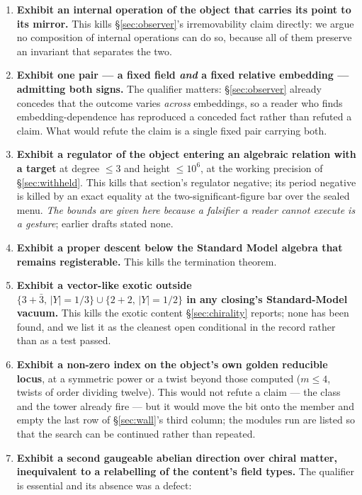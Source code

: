 \documentclass[11pt,a4paper]{article}
\theoremstyle{definition}
\theoremstyle{remark}
\begin{document}
\begin{enumerate}[leftmargin=1.6em,itemsep=3pt]
\item \textbf{Exhibit an internal operation of the object that carries its point to its mirror.}
This kills \S\ref{sec:observer}'s irremovability claim directly: we argue no composition of internal
operations can do so, because all of them preserve an invariant that separates the two.
\item \textbf{Exhibit one pair --- a fixed field \emph{and} a fixed relative embedding --- admitting
both signs.} The qualifier matters: \S\ref{sec:observer} already concedes that the outcome varies
\emph{across} embeddings, so a reader who finds embedding-dependence has reproduced a conceded fact
rather than refuted a claim. What would refute the claim is a single fixed pair carrying both.
\item \textbf{Exhibit a regulator of the object entering an algebraic relation with a target} at
degree $\le 3$ and height $\le 10^6$, at the working precision of \S\ref{sec:withheld}. This kills
that section's regulator negative; its period negative is killed by an exact equality at the two-significant-figure bar
over the sealed menu. \emph{The bounds are given here because a falsifier a reader cannot
execute is a gesture}; earlier drafts stated none.
\item \textbf{Exhibit a proper descent below the Standard Model algebra that remains registerable.} This kills the termination theorem.
\item \textbf{Exhibit a vector-like exotic outside $\{3+\bar{3},\,|Y| = 1/3\} \cup \{2+2,\,|Y| = 1/2\}$ in any closing's Standard-Model vacuum.} This kills the exotic content \S\ref{sec:chirality} reports; none has been found, and we list it as the cleanest open conditional in the record rather than as a test passed.
\item \textbf{Exhibit a non-zero index on the object's own golden reducible locus}, at a symmetric power or a twist beyond those computed ($m \le 4$, twists of order dividing twelve). This would not refute a claim --- the class and the tower already fire --- but it would move the bit onto the member and empty the last row of \S\ref{sec:wall}'s third column; the modules run are listed so that the search can be continued rather than repeated.
\item \textbf{Exhibit a second gaugeable abelian direction over chiral matter, inequivalent to a
relabelling of the content's field types.} The qualifier is essential and its absence was a defect:

\end{enumerate}
\end{document}
